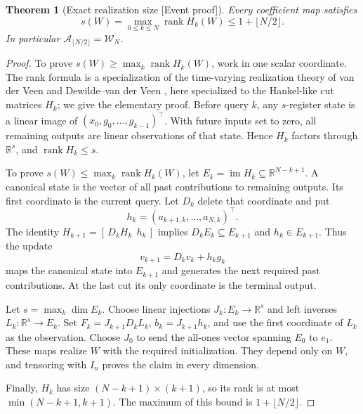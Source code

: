 \documentclass[11pt]{article}
\newcommand{\supportlabel}[1]{\textcolor{blue!60!black}{\small\textsf{[#1]}}}
\newcommand{\eventproof}{\supportlabel{Event proof}}
\numberwithin{equation}{section}
\newtheorem{theorem}{Theorem}[section]
\theoremstyle{definition}
\newcommand{\R}{\mathbb R}
\newcommand{\W}{\mathcal W_N}
\newcommand{\A}{\mathcal A}
\DeclareMathOperator{\rank}{rank}
\DeclareMathOperator{\im}{im}
\begin{document}
\begin{theorem}[Exact realization size \eventproof]\label{thm:realization}
Every coefficient map satisfies
\begin{equation}
 s(W)=\max_{0\le k\le N}\rank H_k(W)
 \le 1+\lfloor N/2\rfloor.
 \label{eq:cut-rank}
\end{equation}
In particular $\A_{\lfloor N/2\rfloor}=\W$.
\end{theorem}
\begin{proof}
To prove $s(W)\ge\max_k\rank H_k(W)$, work in one scalar coordinate. The rank formula is a specialization of the time-varying realization theory of van der Veen \cite{vdVeen95} and Dewilde--van der Veen \cite{DewildevdVeen98}, here specialized to the Hankel-like cut matrices $H_k$; we give the elementary proof. Before query $k$, any $s$-register state is a linear image of $(x_0,g_0,\ldots,g_{k-1})^\top$. With future inputs set to zero, all remaining outputs are linear observations of that state. Hence $H_k$ factors through $\R^s$, and $\rank H_k\le s$.

To prove $s(W)\le\max_k\rank H_k(W)$, let $E_k=\im H_k\subseteq\R^{N-k+1}$. A canonical state is the vector of all past contributions to remaining outputs. Its first coordinate is the current query. Let $D_k$ delete that coordinate and put
\[
 h_k=(a_{k+1,k},\ldots,a_{N,k})^\top.
\]
The identity $H_{k+1}=[\,D_kH_k\ \ h_k\,]$ implies
$D_kE_k\subseteq E_{k+1}$ and $h_k\in E_{k+1}$. Thus the update
\[
 v_{k+1}=D_kv_k+h_kg_k
\]
maps the canonical state into $E_{k+1}$ and generates the next required past contributions. At the last cut its only coordinate is the terminal output.

Let $s=\max_k\dim E_k$. Choose linear injections $J_k:E_k\to\R^s$ and left inverses $L_k:\R^s\to E_k$. Set $F_k=J_{k+1}D_kL_k$, $b_k=J_{k+1}h_k$, and use the first coordinate of $L_k$ as the observation. Choose $J_0$ to send the all-ones vector spanning $E_0$ to $e_1$. These maps realize $W$ with the required initialization. They depend only on $W$, and tensoring with $I_n$ proves the claim in every dimension.

Finally, $H_k$ has size $(N-k+1)\times(k+1)$, so its rank is at most $\min(N-k+1,k+1)$. The maximum of this bound is $1+\lfloor N/2\rfloor$.
\end{proof}
\end{document}
